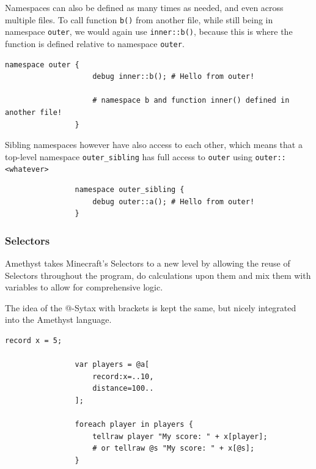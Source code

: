 \documentclass[12pt]{article}
\begin{document}
            
            Namespaces can also be defined as many times as needed, and even across multiple files. To call function \lstinline{b()} from another file, while still being in namespace \lstinline{outer}, we would again use \lstinline{inner::b()}, because this is where the function is defined relative to namespace \lstinline{outer}.

            \begin{lstlisting}[title=file\_2.amy]
                namespace outer {
                    debug inner::b(); # Hello from outer!
                    
                    # namespace b and function inner() defined in another file!
                }
            \end{lstlisting}
            
            Sibling namespaces however have also access to each other, which means that a top-level namespace \lstinline{outer_sibling} has full access to \lstinline{outer} using \lstinline{outer::<whatever>}
            
            \begin{lstlisting}
                namespace outer_sibling {
                    debug outer::a(); # Hello from outer!
                }
            \end{lstlisting}


        \subsubsection{Selectors}
            Amethyst takes Minecraft's Selectors to a new level by allowing the reuse of Selectors throughout the program, do calculations upon them and mix them with variables to allow for comprehensive logic.
            
            The idea of the @-Sytax with brackets is kept the same, but nicely integrated into the Amethyst language.
            
            \begin{lstlisting}[language=Amethyst]
                record x = 5;
                
                var players = @a[
                    record:x=..10,
                    distance=100..
                ];
                 
                foreach player in players {
                    tellraw player "My score: " + x[player];
                    # or tellraw @s "My score: " + x[@s];
                }
            \end{lstlisting}
            
\end{document}
